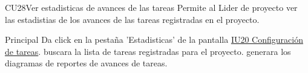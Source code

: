 \begin{UseCase}{CU28}{Ver estadisticas de avances de las tareas}{
		Permite al Lider de proyecto ver las estadistias de los avances de las tareas registradas en el proyecto.
	}
	\end{UseCase}
	\begin{UCtrayectoria}{Principal}
		\UCpaso[\UCactor] Da click en la pestaña 'Estadisticas' de la pantalla \hyperref[fig:IU28]{IU20 Configuración de tareas}.
        \UCpaso [\UCsist] buscara la lista de tareas registradas para el proyecto.
        \UCpaso [\UCsist]  generara los diagramas de reportes de avances de tareas.
	\end{UCtrayectoria}
		

